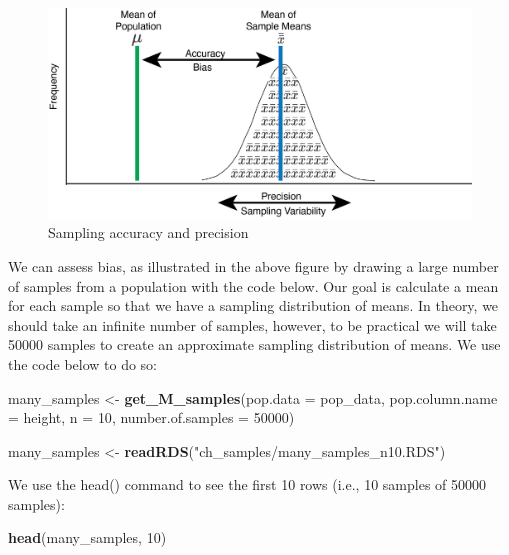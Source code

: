 \documentclass[
]{krantz}
\makeatletter
\newenvironment{Shaded}{\begin{snugshade}}{\end{snugshade}}
\newcommand{\DataTypeTok}[1]{\textcolor[rgb]{0.27,0.27,0.27}{#1}}
\newcommand{\DecValTok}[1]{\textcolor[rgb]{0.06,0.06,0.06}{#1}}
\newcommand{\KeywordTok}[1]{\textcolor[rgb]{0.27,0.27,0.27}{\textbf{#1}}}
\newcommand{\NormalTok}[1]{#1}
\newcommand{\StringTok}[1]{\textcolor[rgb]{0.5,0.5,0.5}{#1}}
\newenvironment{kframe}{%
\medskip{}
\setlength{\fboxsep}{.8em}
 \def\at@end@of@kframe{}%
 \ifinner\ifhmode%
  \def\at@end@of@kframe{\end{minipage}}%
  \begin{minipage}{\columnwidth}%
 \fi\fi%
 \def\FrameCommand##1{\hskip\@totalleftmargin \hskip-\fboxsep
 \colorbox{shadecolor}{##1}\hskip-\fboxsep
     \hskip-\linewidth \hskip-\@totalleftmargin \hskip\columnwidth}%
 \MakeFramed {\advance\hsize-\width
   \@totalleftmargin\z@ \linewidth\hsize
   \@setminipage}}%
 {\par\unskip\endMakeFramed%
 \at@end@of@kframe}
\renewenvironment{Shaded}{\begin{kframe}}{\end{kframe}}
\makeatother
\begin{document}
\begin{figure}
\includegraphics[width=0.8\linewidth]{ch_samples/images/sampling_accuracy} \caption{Sampling accuracy and precision}\label{fig:showbias}
\end{figure}

We can assess bias, as illustrated in the above figure by drawing a large number of samples from a population with the code below. Our goal is calculate a mean for each sample so that we have a sampling distribution of means. In theory, we should take an infinite number of samples, however, to be practical we will take 50000 samples to create an approximate sampling distribution of means. We use the code below to do so:

\begin{Shaded}
\begin{Highlighting}[]
\NormalTok{many_samples <-}\StringTok{ }\KeywordTok{get_M_samples}\NormalTok{(}\DataTypeTok{pop.data =}\NormalTok{ pop_data, }
                              \DataTypeTok{pop.column.name =}\NormalTok{ height,}
                              \DataTypeTok{n =} \DecValTok{10}\NormalTok{,}
                              \DataTypeTok{number.of.samples =} \DecValTok{50000}\NormalTok{)}
\end{Highlighting}
\end{Shaded}

\begin{Shaded}
\begin{Highlighting}[]
\NormalTok{many_samples <-}\StringTok{ }\KeywordTok{readRDS}\NormalTok{(}\StringTok{"ch_samples/many_samples_n10.RDS"}\NormalTok{)}
\end{Highlighting}
\end{Shaded}

We use the head() command to see the first 10 rows (i.e., 10 samples of 50000 samples):

\begin{Shaded}
\begin{Highlighting}[]
\KeywordTok{head}\NormalTok{(many_samples, }\DecValTok{10}\NormalTok{)}
\end{Highlighting}
\end{Shaded}
\end{document}
